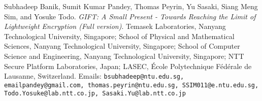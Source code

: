 \begin{thebibliography}{9}

Subhadeep Banik, Sumit Kumar Pandey, Thomas Peyrin, Yu Sasaki, Siang Meng Sim, and Yosuke Todo.
\textit{GIFT: A Small Present - Towards Reaching the Limit of Lightweight Encryption (Full version)}.
Temasek Laboratories, Nanyang Technological University, Singapore; School of Physical and Mathematical Sciences, Nanyang Technological University, Singapore; School of Computer Science and Engineering, Nanyang Technological University, Singapore; NTT Secure Platform Laboratories, Japan; LASEC, École Polytechnique Fédérale de Lausanne, Switzerland.
Emails: \texttt{bsubhadeep@ntu.edu.sg, emailpandey@gmail.com, thomas.peyrin@ntu.edu.sg, SSIM011@e.ntu.edu.sg, Todo.Yosuke@lab.ntt.co.jp, Sasaki.Yu@lab.ntt.co.jp}

\end{thebibliography}
